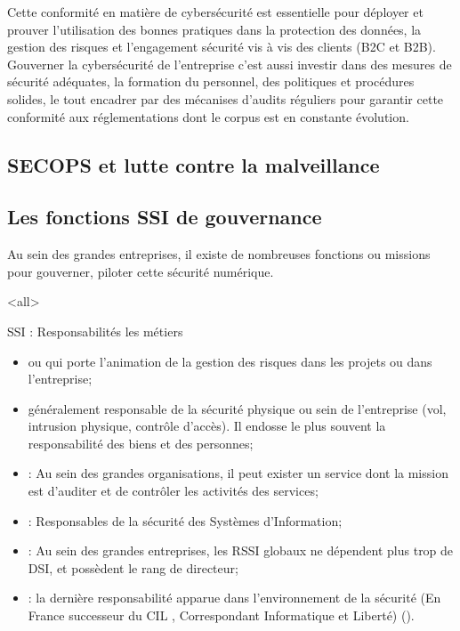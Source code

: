 Cette conformité en matière de cybersécurité est essentielle pour déployer et prouver l'utilisation des bonnes pratiques dans la protection des données, la gestion des risques et l'engagement sécurité vis à vis des clients (B2C et B2B). Gouverner la cybersécurité de l'entreprise c'est aussi investir dans des mesures de sécurité adéquates, la formation du personnel, des politiques et procédures solides, le tout encadrer par des mécanises d'audits réguliers pour garantir cette conformité aux réglementations dont le corpus est en constante évolution.

\subsection{SECOPS et lutte contre la malveillance}

\utodo

\subsection{Les fonctions SSI de gouvernance}

Au sein des grandes entreprises, il existe de nombreuses fonctions ou missions pour gouverner, piloter cette sécurité numérique.

\mode<all>{\texframe
{SSI : Responsabilités}
{les métiers}
{
\begin{itemize}
 \item {} ou  qui porte l'animation de la gestion des risques dans les projets ou dans l'entreprise;
\item {} généralement responsable de la sécurité physique ou sein de l'entreprise (vol, intrusion physique, contrôle d'accès). Il endosse le plus souvent la responsabilité des biens et des personnes;
\item {} : Au sein des grandes organisations, il peut exister un service  dont la mission est d'auditer et de contrôler les activités des services;
\item {} : Responsables de la sécurité des Systèmes d'Information;
\item {} : Au sein des grandes entreprises, les RSSI globaux ne dépendent plus trop de DSI, et possèdent le rang de directeur;
\item {} : la dernière responsabilité apparue dans l'environnement de la sécurité (En France successeur du CIL , Correspondant Informatique et Liberté) ().
\end{itemize}
}}%



